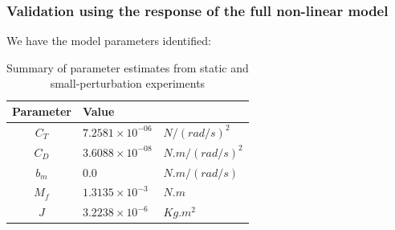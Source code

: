 \subsubsection{Validation using the response of the full non-linear model}
We have the model parameters identified:
\begin{table}[H]
    \centering
    \begin{tabular}{c l l}
        \hline \hline
        Parameter & Value & \\ \hline \hline
        $C_T$ & $7.2581 \times 10^{-06}$ & $N/(rad/s)^2$  \\
        $C_D$ & $3.6088 \times 10^{-08}$ & $N.m/(rad/s)^2$ \\
        $b_m$ & $0.0$                    & $N.m/(rad/s)$\\
        $M_f$ & $1.3135 \times 10^{-3}$  & $N.m$\\
        $J$   & $3.2238 \times 10^{-6}$  & $Kg .m^2$ \\\hline \hline
    \end{tabular}
    \caption{Summary of parameter estimates from static and small-perturbation experiments}
    \label{tab::parm_ests}
\end{table}

